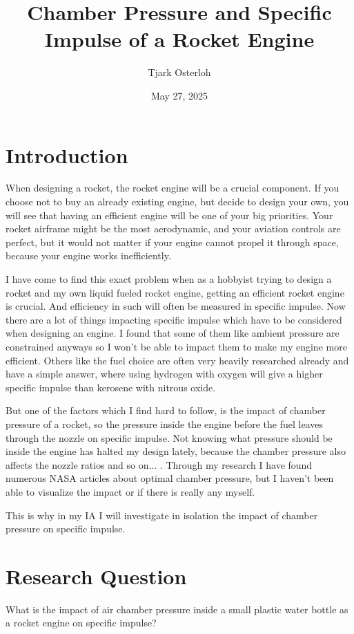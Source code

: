 \documentclass[12pt,a4paper]{article}
\title{\textbf{Chamber Pressure and Specific Impulse of a Rocket Engine}}
\author{Tjark Osterloh}
\date{May 27, 2025}
\begin{document}
\maketitle

\section{Introduction}

When designing a rocket, the rocket engine will be a crucial component. If you choose not to buy an already existing engine, but decide to design your own, you will see that having an efficient engine will be one of your big priorities. Your rocket airframe might be the most aerodynamic, and your aviation controls are perfect, but it would not matter if your engine cannot propel it through space, because your engine works inefficiently.

I have come to find this exact problem when as a hobbyist trying to design a rocket and my own liquid fueled rocket engine, getting an efficient rocket engine is crucial. And efficiency in such will often be measured in specific impulse. Now there are a lot of things impacting specific impulse which have to be considered when designing an engine. I found that some of them like ambient pressure are constrained anyways so I won't be able to impact them to make my engine more efficient. Others like the fuel choice are often very heavily researched already and have a simple answer, where using hydrogen with oxygen will give a higher specific impulse than kerosene with nitrous oxide.

But one of the factors which I find hard to follow, is the impact of chamber pressure of a rocket, so the pressure inside the engine before the fuel leaves through the nozzle on specific impulse. Not knowing what pressure should be inside the engine has halted my design lately, because the chamber pressure also affects the nozzle ratios and so on... . Through my research I have found numerous NASA articles about optimal chamber pressure, but I haven't been able to visualize the impact or if there is really any myself.

This is why in my IA I will investigate in isolation the impact of chamber pressure on specific impulse.

\section{Research Question}

What is the impact of air chamber pressure inside a small plastic water bottle as a rocket engine on specific impulse?
\end{document}
